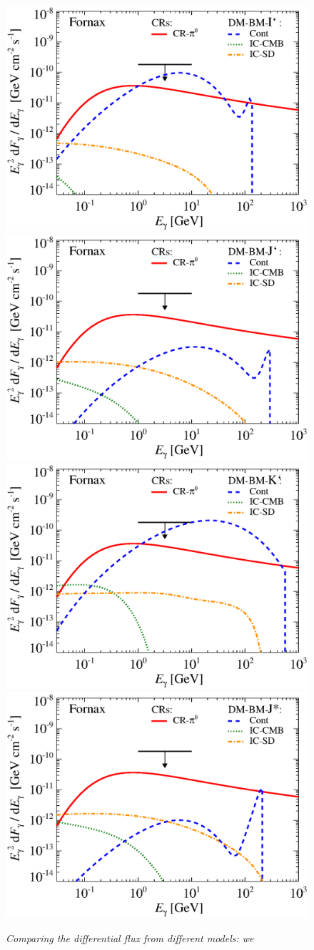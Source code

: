 \documentclass[10pt,aps,pra,reprint,amsmath,amsfonts,amssymb,showpacs]{revtex4-1}
\begin{document}
\begin{figure}
\begin{minipage}{2.0\columnwidth}
 \includegraphics[width=0.49\columnwidth]{figures/flux.BMcompI.v8.0.1deg.1.6T.SubMass.IR2.noMW.woGal.eps}
\includegraphics[width=0.49\columnwidth]{figures/flux.BMcompJ.v8.0.1deg.1.6T.SubMass.IR2.noMW.woGal.eps}
\includegraphics[width=0.49\columnwidth]{figures/flux.BMcompK.v8.0.1deg.1.6T.SubMass.IR2.noMW.woGal.eps}
\includegraphics[width=0.49\columnwidth]{figures/flux.BMcompJs.v8.0.1deg.1.6T.SubMass.IR2.noMW.woGal.eps}
\caption{\it Comparing the differential flux from different models: we
}
\end{minipage}
\end{figure}
\end{document}
